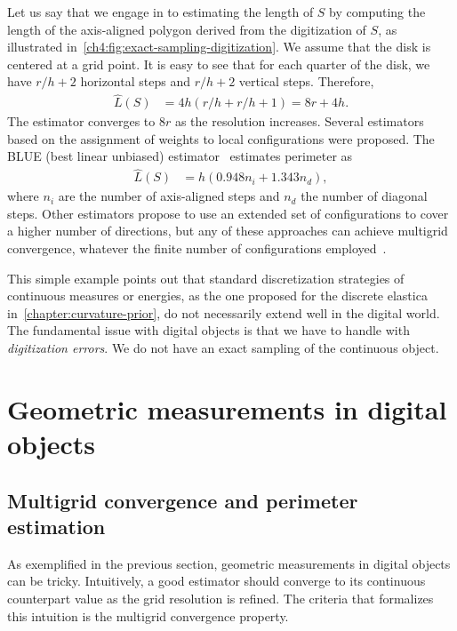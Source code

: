 Let us say that we engage in to estimating the length of $S$ by computing the length of the axis-aligned polygon derived from the digitization of $S$, as illustrated in~\cref{ch4:fig:exact-sampling-digitization}. We assume that the disk is centered at a grid point. It is easy to see that for each quarter of the disk, we have $r/h + 2$ horizontal steps and $r/h + 2$ vertical steps. Therefore,
\begin{align*}
	\hat{L}(S) &= 4h(r/h + r/h + 1) = 8r + 4h.
\end{align*}
%
The estimator converges to $8r$ as the resolution increases. %
Several estimators based on the assignment of weights to local configurations were proposed. The BLUE (best linear unbiased) estimator~\cite{dorst87length} estimates perimeter as 
\begin{align*}
	\hat{L}(S) &= h( 0.948 n_i + 1.343 n_d),
\end{align*}
where $n_i$ are the number of axis-aligned steps and $n_d$ the number of diagonal steps. Other estimators propose to use an extended set of configurations to cover a higher number of directions, but any of these approaches can achieve multigrid convergence, whatever the finite number of configurations employed~\cite{tajine03local}.

This simple example points out that standard discretization strategies of continuous measures or energies, as the one proposed for the discrete elastica in~\cref{chapter:curvature-prior}, do not necessarily extend well in the digital world. The fundamental issue with digital objects is that we have to handle with \emph{digitization errors}. We do not have an exact sampling of the continuous object.

\section{Geometric measurements in digital objects}\label{ch4:sec:geometric-measurements}

\subsection{Multigrid convergence and perimeter estimation}

As exemplified in the previous section, geometric measurements in digital objects can be tricky. Intuitively, a good estimator should converge to its continuous counterpart value as the grid resolution is refined. The criteria that formalizes this intuition is the multigrid convergence property.

